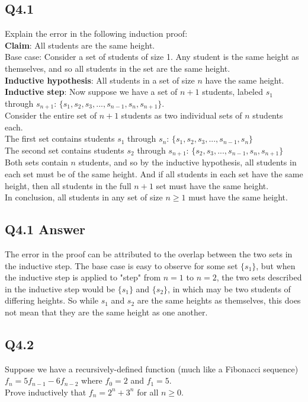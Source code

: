 \documentclass{article}
\begin{document}
\subsection*{Q4.1}
Explain the error in the following induction proof:
\\ \textbf{Claim}: All students are the same height.
\\ Base case: Consider a set of students of size 1. Any student is the same height as themselves, and so all students in the set are the same height.
\\ \textbf{Inductive hypothesis}: All students in a set of size $n$ have the same height. 
\\ \textbf{Inductive step}: Now suppose we have a set of $n+1$ students, labeled $s_1$ through $s_{n+1}$: $\{s_1,s_2,s_3,...,s_{n-1},s_n,s_{n+1}\}$.
\\ Consider the entire set of $n+1$ students as two individual sets of $n$ students each.
\\ The first set contains students $s_1$ through $s_n$: $\{s_1,s_2,s_3,...,s_{n-1},s_n\}$
\\ The second set contains students $s_2$ through $s_{n+1}$: $\{s_2,s_3,...,s_{n-1},s_n,s_{n+1}\}$
\\ Both sets contain $n$ students, and so by the inductive hypothesis, all students in each set must be of the same height. And if all students in each set have the same height, then all students in the full $n+1$ set must have the same height.
\\ In conclusion, all students in any set of size $n\geq1$ must have the same height.
\newpage
\subsection*{Q4.1 Answer}
The error in the proof can be attributed to the overlap between the two sets in the inductive step. The base case is easy to observe for some set $\{s_1\}$, but when the inductive step is applied to "step" from $n=1$ to $n=2$, the two sets described in the inductive step would be $\{s_1\}$ and $\{s_2\}$, in which may be two students of differing heights. So while $s_1$ and $s_2$ are the same heights as themselves, this does not mean that they are the same height as one another.
\newpage

\subsection*{Q4.2}
Suppose we have a recursively-defined function (much like a Fibonacci sequence) $f_n=5f_{n-1}-6f_{n-2}$ where $f_0=2$ and $f_1=5$.
\\ Prove inductively that $f_n=2^n+3^n$ for all $n\geq0$.
\newpage
\end{document}
